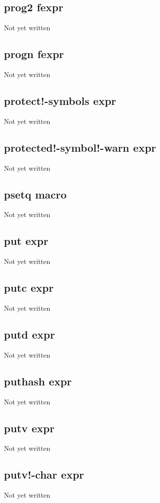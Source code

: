 \documentclass[a4paper,11pt]{article}
\begin{document}
{\subsection{\ttfamily prog2 fexpr}
Not yet written

\subsection{\ttfamily progn fexpr}
Not yet written

\subsection{\ttfamily protect!-symbols expr}
Not yet written

\subsection{\ttfamily protected!-symbol!-warn expr}
Not yet written

\subsection{\ttfamily psetq macro}
Not yet written

\subsection{\ttfamily put expr}
Not yet written

\subsection{\ttfamily putc expr}
Not yet written

\subsection{\ttfamily putd expr}
Not yet written

\subsection{\ttfamily puthash expr}
Not yet written

\subsection{\ttfamily putv expr}
Not yet written

\subsection{\ttfamily putv!-char expr}
Not yet written

}
\end{document}
